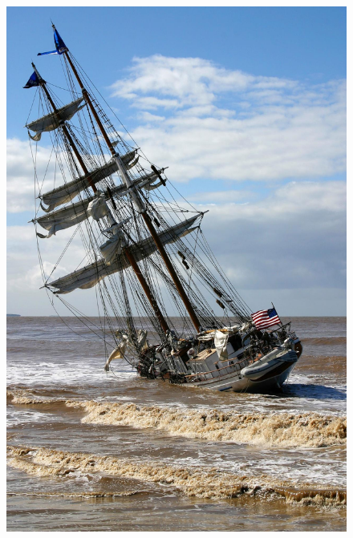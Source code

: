 \documentclass{article}
\begin{document}
\pagestyle{empty}
\thispagestyle{empty}
\pagecolor{normalcolor!70}



\begin{figure}[p]
\begin{adjustbox}{minipage=[c]{\textwidth-10mm},margin= 5mm 5mm 5mm 5mm, frame=1pt, bgcolor=almond,env=center}%
\begin{center}
\includegraphics[width=.6\paperwidth,trim=0 6in 0 .7in,clip]{image3.jpg}
\end{center}

\begin{center}
\begin{minipage}[t]{0.7\paperwidth}\raggedright
\medskip
  

\end{minipage}
\end{center}
\end{adjustbox}
\end{figure}
\end{document}
